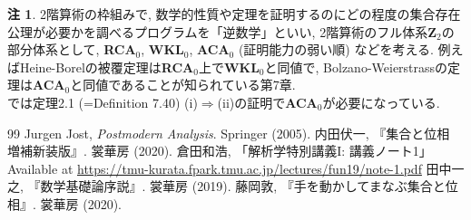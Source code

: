 \documentclass{jsarticle}
\theoremstyle{definition}
\newtheorem*{rem*}{注}
\begin{document}
\begin{rem*}
2階算術の枠組みで, 数学的性質や定理を証明するのにどの程度の集合存在公理が必要かを調べるプログラムを「逆数学」といい, 2階算術のフル体系\textbf{Z}$_2$の部分体系として, \textbf{RCA$_0$}, \textbf{WKL$_0$}, \textbf{ACA$_0$} (証明能力の弱い順) などを考える. 例えばHeine-Borelの被覆定理は\textbf{RCA$_0$}上で\textbf{WKL$_0$}と同値で, Bolzano-Weierstrassの定理は\textbf{ACA$_0$}と同値であることが知られている\cite{田中}第7章.\\
\indent\cite{Jost}では定理2.1 (=Definition 7.40) (i)$\Rightarrow$(ii)の証明で\textbf{ACA$_0$}が必要になっている.
 
\end{rem*}








\begin{thebibliography}{99}
 Jurgen Jost, \textit{Postmodern Analysis}. Springer (2005).
 内田伏一, 『集合と位相 増補新装版』. 裳華房 (2020).
 倉田和浩, 「解析学特別講義I: 講義ノート1」\\
 Available at \url{https://tmu-kurata.fpark.tmu.ac.jp/lectures/fun19/note-1.pdf}
 田中一之, 『数学基礎論序説』. 裳華房 (2019).
 藤岡敦, 『手を動かしてまなぶ集合と位相』. 裳華房 (2020).
\end{thebibliography}
\end{document}
